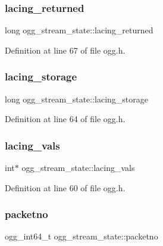 \subsubsection{\texorpdfstring{lacing\_returned}{lacing\_returned}}
{\footnotesize\ttfamily long ogg\+\_\+stream\+\_\+state\+::lacing\+\_\+returned}



Definition at line 67 of file ogg.\+h.

\mbox{\label{structogg__stream__state_a23844488216514760bc66b38dfd6d4ae}} 
\subsubsection{\texorpdfstring{lacing\_storage}{lacing\_storage}}
{\footnotesize\ttfamily long ogg\+\_\+stream\+\_\+state\+::lacing\+\_\+storage}



Definition at line 64 of file ogg.\+h.

\mbox{\label{structogg__stream__state_a55f3febfdfa9600b66fa2a990297813e}} 
\subsubsection{\texorpdfstring{lacing\_vals}{lacing\_vals}}
{\footnotesize\ttfamily int$\ast$ ogg\+\_\+stream\+\_\+state\+::lacing\+\_\+vals}



Definition at line 60 of file ogg.\+h.

\mbox{\label{structogg__stream__state_a1bebf380025b6ca0841497e7ab2b5c34}} 
\subsubsection{\texorpdfstring{packetno}{packetno}}
{\footnotesize\ttfamily ogg\+\_\+int64\+\_\+t ogg\+\_\+stream\+\_\+state\+::packetno}



